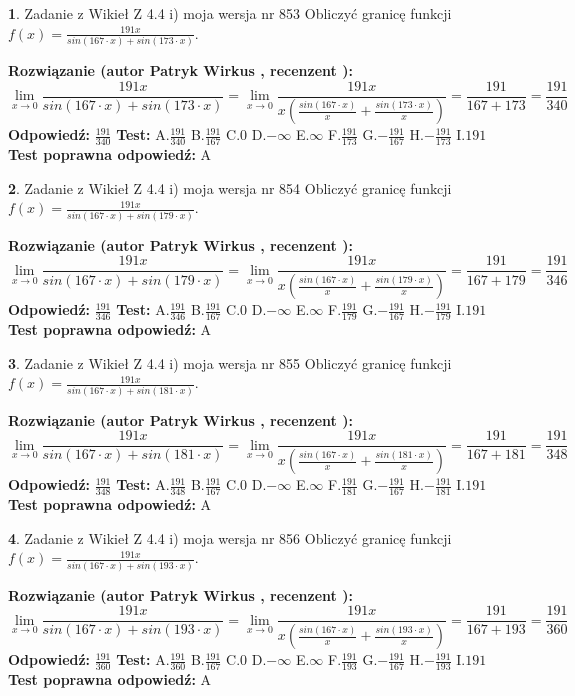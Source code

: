 \documentclass[12pt, a4paper]{article}
\theoremstyle{definition} %
\newtheorem{zad}{}
\newcommand{\zadStart}[1]{\begin{zad}#1\newline}
\newcommand{\zadStop}{\end{zad}}
\newcommand{\rozwStart}[2]{\noindent \textbf{Rozwiązanie (autor #1 , recenzent #2): }\newline}
\newcommand{\rozwStop}{\newline}
\newcommand{\odpStart}{\noindent \textbf{Odpowiedź:}\newline}
\newcommand{\odpStop}{\newline}
\newcommand{\testStart}{\noindent \textbf{Test:}\newline}
\newcommand{\testStop}{\newline}
\newcommand{\kluczStart}{\noindent \textbf{Test poprawna odpowiedź:}\newline}
\newcommand{\kluczStop}{\newline}
\begin{document}
\zadStart{Zadanie z Wikieł Z 4.4 i) moja wersja nr 853}
Obliczyć granicę funkcji $f(x)=\frac{191x}{sin(167\cdot x) +sin(173\cdot x)}$.
\zadStop
\rozwStart{Patryk Wirkus}{}
$$\lim\limits_{x\to 0}\frac{191x}{sin(167\cdot x) +sin(173\cdot x)}=\lim\limits_{x\to 0}\frac{191x}{x(\frac{sin(167\cdot x)}{x}+\frac{sin(173\cdot x)}{x})}=\frac{191}{167+173} = \frac{191}{340}$$
\rozwStop
\odpStart
$\frac{191}{340}$
\odpStop
\testStart
A.$\frac{191}{340}$
B.$\frac{191}{167}$
C.$0$
D.$-\infty$
E.$\infty$
F.$\frac{191}{173}$
G.$-\frac{191}{167}$
H.$-\frac{191}{173}$
I.$191$
\testStop
\kluczStart
A
\kluczStop



\zadStart{Zadanie z Wikieł Z 4.4 i) moja wersja nr 854}
Obliczyć granicę funkcji $f(x)=\frac{191x}{sin(167\cdot x) +sin(179\cdot x)}$.
\zadStop
\rozwStart{Patryk Wirkus}{}
$$\lim\limits_{x\to 0}\frac{191x}{sin(167\cdot x) +sin(179\cdot x)}=\lim\limits_{x\to 0}\frac{191x}{x(\frac{sin(167\cdot x)}{x}+\frac{sin(179\cdot x)}{x})}=\frac{191}{167+179} = \frac{191}{346}$$
\rozwStop
\odpStart
$\frac{191}{346}$
\odpStop
\testStart
A.$\frac{191}{346}$
B.$\frac{191}{167}$
C.$0$
D.$-\infty$
E.$\infty$
F.$\frac{191}{179}$
G.$-\frac{191}{167}$
H.$-\frac{191}{179}$
I.$191$
\testStop
\kluczStart
A
\kluczStop



\zadStart{Zadanie z Wikieł Z 4.4 i) moja wersja nr 855}
Obliczyć granicę funkcji $f(x)=\frac{191x}{sin(167\cdot x) +sin(181\cdot x)}$.
\zadStop
\rozwStart{Patryk Wirkus}{}
$$\lim\limits_{x\to 0}\frac{191x}{sin(167\cdot x) +sin(181\cdot x)}=\lim\limits_{x\to 0}\frac{191x}{x(\frac{sin(167\cdot x)}{x}+\frac{sin(181\cdot x)}{x})}=\frac{191}{167+181} = \frac{191}{348}$$
\rozwStop
\odpStart
$\frac{191}{348}$
\odpStop
\testStart
A.$\frac{191}{348}$
B.$\frac{191}{167}$
C.$0$
D.$-\infty$
E.$\infty$
F.$\frac{191}{181}$
G.$-\frac{191}{167}$
H.$-\frac{191}{181}$
I.$191$
\testStop
\kluczStart
A
\kluczStop



\zadStart{Zadanie z Wikieł Z 4.4 i) moja wersja nr 856}
Obliczyć granicę funkcji $f(x)=\frac{191x}{sin(167\cdot x) +sin(193\cdot x)}$.
\zadStop
\rozwStart{Patryk Wirkus}{}
$$\lim\limits_{x\to 0}\frac{191x}{sin(167\cdot x) +sin(193\cdot x)}=\lim\limits_{x\to 0}\frac{191x}{x(\frac{sin(167\cdot x)}{x}+\frac{sin(193\cdot x)}{x})}=\frac{191}{167+193} = \frac{191}{360}$$
\rozwStop
\odpStart
$\frac{191}{360}$
\odpStop
\testStart
A.$\frac{191}{360}$
B.$\frac{191}{167}$
C.$0$
D.$-\infty$
E.$\infty$
F.$\frac{191}{193}$
G.$-\frac{191}{167}$
H.$-\frac{191}{193}$
I.$191$
\testStop
\kluczStart
A
\kluczStop
\end{document}
